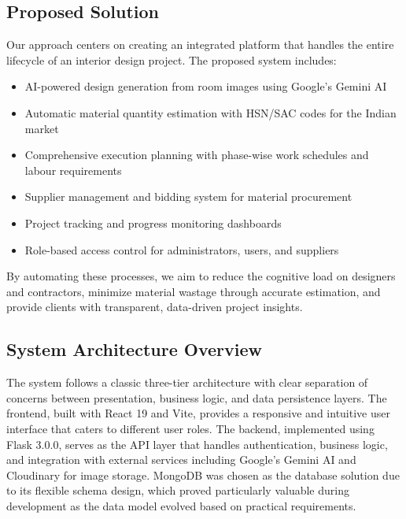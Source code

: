 \documentclass[conference]{IEEEtran}
\begin{document}
\subsection{Proposed Solution}
Our approach centers on creating an integrated platform that handles the entire lifecycle of an interior design project. The proposed system includes:
\begin{itemize}
    \item AI-powered design generation from room images using Google's Gemini AI
    \item Automatic material quantity estimation with HSN/SAC codes for the Indian market
    \item Comprehensive execution planning with phase-wise work schedules and labour requirements
    \item Supplier management and bidding system for material procurement
    \item Project tracking and progress monitoring dashboards
    \item Role-based access control for administrators, users, and suppliers
\end{itemize}

By automating these processes, we aim to reduce the cognitive load on designers and contractors, minimize material wastage through accurate estimation, and provide clients with transparent, data-driven project insights.

\subsection{System Architecture Overview}
The system follows a classic three-tier architecture with clear separation of concerns between presentation, business logic, and data persistence layers. The frontend, built with React 19 and Vite, provides a responsive and intuitive user interface that caters to different user roles. The backend, implemented using Flask 3.0.0, serves as the API layer that handles authentication, business logic, and integration with external services including Google's Gemini AI and Cloudinary for image storage. MongoDB was chosen as the database solution due to its flexible schema design, which proved particularly valuable during development as the data model evolved based on practical requirements.
\end{document}
